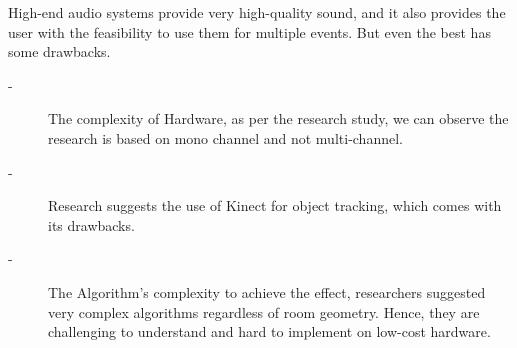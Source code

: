 \documentclass[../../../patent_v1.tex]{subfiles}
\begin{document}
High-end audio systems provide very high-quality sound, and it also provides the 
user with the feasibility to use them for multiple events. But even the best has 
some drawbacks.

\begin{description}
    \item[-]The complexity of Hardware, as per the research study, we can observe 
    the research is based on mono channel and not multi-channel. 
    \item[-]Research suggests the use of Kinect for object tracking, which comes 
    with its drawbacks.
    \item[-]The Algorithm's complexity to achieve the effect, researchers suggested 
    very complex algorithms regardless of room geometry. Hence, they are challenging 
    to understand and hard to implement on low-cost hardware.
\end{description}
\end{document}
